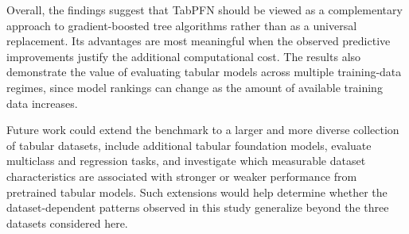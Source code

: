 Overall, the findings suggest that TabPFN should be viewed as a complementary approach to gradient-boosted tree algorithms rather than as a universal replacement. Its advantages are most meaningful when the observed predictive improvements justify the additional computational cost. The results also demonstrate the value of evaluating tabular models across multiple training-data regimes, since model rankings can change as the amount of available training data increases.

Future work could extend the benchmark to a larger and more diverse collection of tabular datasets, include additional tabular foundation models, evaluate multiclass and regression tasks, and investigate which measurable dataset characteristics are associated with stronger or weaker performance from pretrained tabular models. Such extensions would help determine whether the dataset-dependent patterns observed in this study generalize beyond the three datasets considered here.
